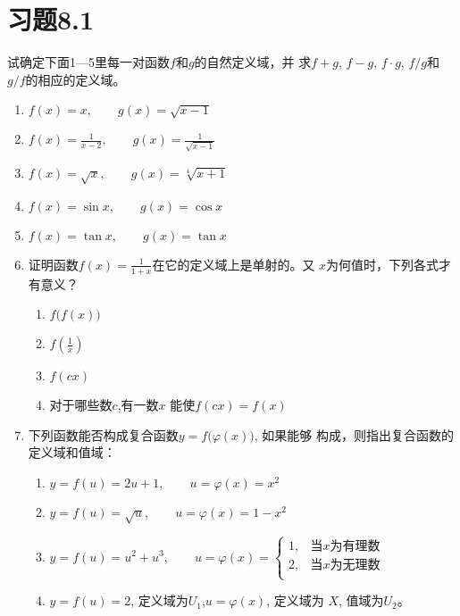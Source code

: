 \section*{习题8.1}

试确定下面1---5里每一对函数$f$和$g$的自然定义域，并
求$f+g$, $f-g$, $f\cdot g$, $f/g$和$g/f$的相应的定义域。

\begin{enumerate}
    \item $f(x)=x,\qquad g(x)=\sqrt{x-1}$
    \item $f(x)=\frac{1}{x-2},\qquad g(x)=\frac{1}{\sqrt{x-1}}$
        \item $f(x)=\sqrt{x},\qquad g(x)=\sqrt[4]{x+1}$
    \item $f(x)=\sin x,\qquad g(x)=\cos x$
    \item $f(x)=\tan x,\qquad g(x)=\tan x$
    \item 证明函数$f(x)=\frac{1}{1+x}$在它的定义域上是单射的。又
    $x$为何值时，下列各式才有意义？
    \begin{multicols}{2}
\begin{enumerate}
    \item $f\big(f(x)\big)$
    \item $f\left(\frac{1}{x}\right)$
    \item $f(cx)$
    \item 对于哪些数$c$,有一数$x$
    能使$f(cx)=f(x)$
\end{enumerate}        
    \end{multicols}

\item 下列函数能否构成复合函数$y=f\big(\varphi(x)\big)$, 如果能够
构成，则指出复合函数的定义域和值域：
\begin{enumerate}
    \item $y=f(u)=2u+1,\qquad u=\varphi(x)=x^2$
    \item $y=f(u)=\sqrt{u},\qquad u=\varphi(x)=1-x^2$
    \item $y=f(u)=u^2+u^3, \qquad u=\varphi(x)=\begin{cases}
        1,& \text{当$x$为有理数}\\
        2,&\text{当$x$为无理数}\\
    \end{cases}$
    \item $y=f(u)=2$, 定义域为$U_1$,\qquad  $u=\varphi(x)$, 定义域为
    $X$, 值域为$U_2$。
\end{enumerate}


\end{enumerate}

